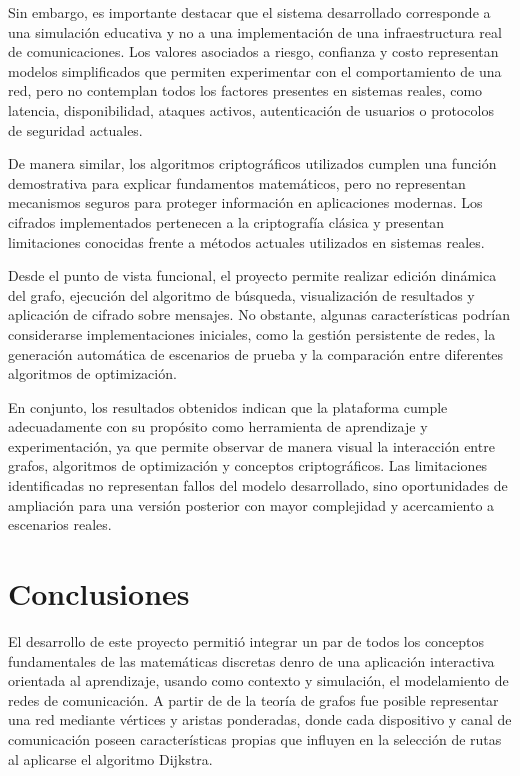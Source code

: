 \documentclass[conference]{IEEEtran}
\begin{document}
Sin embargo, es importante destacar que el sistema desarrollado corresponde a una simulación educativa y no a una implementación de una infraestructura real de comunicaciones. Los valores asociados a riesgo, confianza y costo representan modelos simplificados que permiten experimentar con el comportamiento de una red, pero no contemplan todos los factores presentes en sistemas reales, como latencia, disponibilidad, ataques activos, autenticación de usuarios o protocolos de seguridad actuales.

De manera similar, los algoritmos criptográficos utilizados cumplen una función demostrativa para explicar fundamentos matemáticos, pero no representan mecanismos seguros para proteger información en aplicaciones modernas. Los cifrados implementados pertenecen a la criptografía clásica y presentan limitaciones conocidas frente a métodos actuales utilizados en sistemas reales.

Desde el punto de vista funcional, el proyecto permite realizar edición dinámica del grafo, ejecución del algoritmo de búsqueda, visualización de resultados y aplicación de cifrado sobre mensajes. No obstante, algunas características podrían considerarse implementaciones iniciales, como la gestión persistente de redes, la generación automática de escenarios de prueba y la comparación entre diferentes algoritmos de optimización.

En conjunto, los resultados obtenidos indican que la plataforma cumple adecuadamente con su propósito como herramienta de aprendizaje y experimentación, ya que permite observar de manera visual la interacción entre grafos, algoritmos de optimización y conceptos criptográficos. Las limitaciones identificadas no representan fallos del modelo desarrollado, sino oportunidades de ampliación para una versión posterior con mayor complejidad y acercamiento a escenarios reales.

\section{Conclusiones}
El desarrollo de este proyecto permitió integrar un par de todos los conceptos fundamentales de las matemáticas discretas denro de una aplicación interactiva orientada al aprendizaje, usando como contexto y simulación, el modelamiento de redes de comunicación. A partir de de la teoría de grafos fue posible representar una red mediante vértices y aristas ponderadas, donde cada dispositivo y canal de comunicación poseen características propias que influyen en la selección de rutas al aplicarse el algoritmo Dijkstra.
\end{document}
